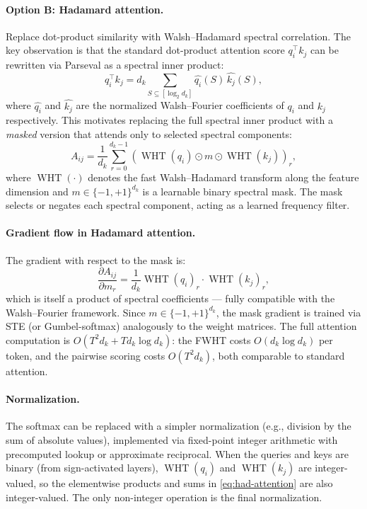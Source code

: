 \documentclass[12pt,a4paper]{article}
\theoremstyle{plain}
\theoremstyle{definition}
\theoremstyle{remark}
\newcommand{\pmone}{\{-1,+1\}}
\DeclareMathOperator{\WHT}{WHT}
\begin{document}
\paragraph{Option B: Hadamard attention.}
Replace dot-product similarity with Walsh--Hadamard spectral correlation. The key observation is that the standard dot-product attention score $q_i^\top k_j$ can be rewritten via Parseval as a spectral inner product:
\[
    q_i^\top k_j = d_k \sum_{S \subseteq [\log_2 d_k]} \widehat{q_i}(S)\, \widehat{k_j}(S),
\]
where $\widehat{q_i}$ and $\widehat{k_j}$ are the normalized Walsh--Fourier coefficients of $q_i$ and $k_j$ respectively. This motivates replacing the full spectral inner product with a \emph{masked} version that attends only to selected spectral components:
\begin{equation}\label{eq:had-attention}
    A_{ij} = \frac{1}{d_k} \sum_{r=0}^{d_k - 1} \left( \WHT(q_i) \odot m \odot \WHT(k_j) \right)_r,
\end{equation}
where $\WHT(\cdot)$ denotes the fast Walsh--Hadamard transform along the feature dimension and $m \in \pmone^{d_k}$ is a learnable binary spectral mask. The mask selects or negates each spectral component, acting as a learned frequency filter.

\paragraph{Gradient flow in Hadamard attention.}
The gradient with respect to the mask is:
\[
    \frac{\partial A_{ij}}{\partial m_r} = \frac{1}{d_k} \WHT(q_i)_r \cdot \WHT(k_j)_r,
\]
which is itself a product of spectral coefficients --- fully compatible with the Walsh--Fourier framework. Since $m \in \pmone^{d_k}$, the mask gradient is trained via STE (or Gumbel-softmax) analogously to the weight matrices. The full attention computation is $O(T^2 d_k + T d_k \log d_k)$: the FWHT costs $O(d_k \log d_k)$ per token, and the pairwise scoring costs $O(T^2 d_k)$, both comparable to standard attention.

\paragraph{Normalization.}
The softmax can be replaced with a simpler normalization (e.g., division by the sum of absolute values), implemented via fixed-point integer arithmetic with precomputed lookup or approximate reciprocal. When the queries and keys are binary (from sign-activated layers), $\WHT(q_i)$ and $\WHT(k_j)$ are integer-valued, so the elementwise products and sums in \eqref{eq:had-attention} are also integer-valued. The only non-integer operation is the final normalization.
\end{document}
